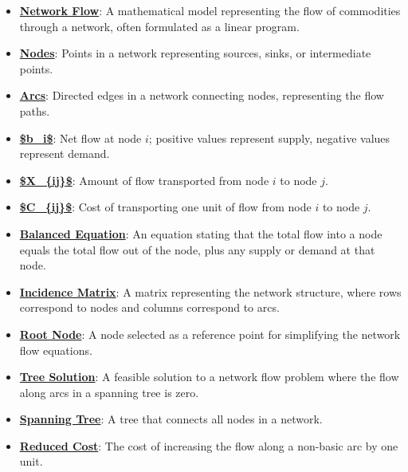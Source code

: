 \documentclass{article}%
\begin{document}
\begin{itemize}[leftmargin=*]%
\item \href{https://www.math.purdue.edu/~yipn/421/2024-11-05-NetFlows.pdf#page=1}{\textbf{Network Flow}}: A mathematical model representing the flow of commodities through a network, often formulated as a linear program.%
\item \href{https://www.math.purdue.edu/~yipn/421/2024-11-05-NetFlows.pdf#page=1}{\textbf{Nodes}}: Points in a network representing sources, sinks, or intermediate points.%
\item \href{https://www.math.purdue.edu/~yipn/421/2024-11-05-NetFlows.pdf#page=1}{\textbf{Arcs}}: Directed edges in a network connecting nodes, representing the flow paths.%
\item \href{https://www.math.purdue.edu/~yipn/421/2024-11-05-NetFlows.pdf#page=2}{\textbf{\$b\_i\$}}: Net flow at node $i$; positive values represent supply, negative values represent demand.%
\item \href{https://www.math.purdue.edu/~yipn/421/2024-11-05-NetFlows.pdf#page=2}{\textbf{\$X\_\{ij\}\$}}: Amount of flow transported from node $i$ to node $j$.%
\item \href{https://www.math.purdue.edu/~yipn/421/2024-11-05-NetFlows.pdf#page=2}{\textbf{\$C\_\{ij\}\$}}: Cost of transporting one unit of flow from node $i$ to node $j$.%
\item \href{https://www.math.purdue.edu/~yipn/421/2024-11-05-NetFlows.pdf#page=3}{\textbf{Balanced Equation}}: An equation stating that the total flow into a node equals the total flow out of the node, plus any supply or demand at that node.%
\item \href{https://www.math.purdue.edu/~yipn/421/2024-11-05-NetFlows.pdf#page=4}{\textbf{Incidence Matrix}}: A matrix representing the network structure, where rows correspond to nodes and columns correspond to arcs.%
\item \href{https://www.math.purdue.edu/~yipn/421/2024-11-05-NetFlows.pdf#page=6}{\textbf{Root Node}}: A node selected as a reference point for simplifying the network flow equations.%
\item \href{https://www.math.purdue.edu/~yipn/421/2024-11-05-NetFlows.pdf#page=11}{\textbf{Tree Solution}}: A feasible solution to a network flow problem where the flow along arcs in a spanning tree is zero.%
\item \href{https://www.math.purdue.edu/~yipn/421/2024-11-05-NetFlows.pdf#page=10}{\textbf{Spanning Tree}}: A tree that connects all nodes in a network.%
\item \href{https://www.math.purdue.edu/~yipn/421/2024-11-05-NetFlows.pdf#page=22}{\textbf{Reduced Cost}}: The cost of increasing the flow along a non-basic arc by one unit.%
\end{itemize}%
\end{document}
